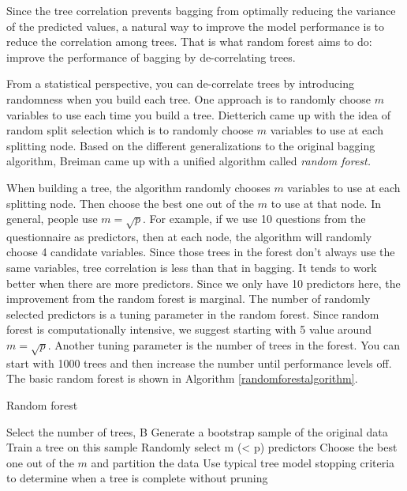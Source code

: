 \documentclass[
  12pt,
]{krantz}
\begin{document}
Since the tree correlation prevents bagging from optimally reducing the variance of the predicted values, a natural way to improve the model performance is to reduce the correlation among trees. That is what random forest aims to do: improve the performance of bagging by de-correlating trees.

From a statistical perspective, you can de-correlate trees by introducing randomness when you build each tree. One approach \citep{Ho1998, amit1997} is to randomly choose \(m\) variables to use each time you build a tree. Dietterich\citep{Dietterich2000} came up with the idea of random split selection which is to randomly choose \(m\) variables to use at each splitting node. Based on the different generalizations to the original bagging algorithm, Breiman \citep{Breiman2001} came up with a unified algorithm called \emph{random forest.}

When building a tree, the algorithm randomly chooses \(m\) variables to use at each splitting node. Then choose the best one out of the \(m\) to use at that node. In general, people use \(m=\sqrt{p}\). For example, if we use 10 questions from the questionnaire as predictors, then at each node, the algorithm will randomly choose 4 candidate variables. Since those trees in the forest don't always use the same variables, tree correlation is less than that in bagging. It tends to work better when there are more predictors. Since we only have 10 predictors here, the improvement from the random forest is marginal. The number of randomly selected predictors is a tuning parameter in the random forest. Since random forest is computationally intensive, we suggest starting with 5 value around \(m=\sqrt{p}\). Another tuning parameter is the number of trees in the forest. You can start with 1000 trees and then increase the number until performance levels off. The basic random forest is shown in Algorithm \ref{randomforestalgorithm}.

\begin{algorithm}
\caption{Random forest}\label{randomforestalgorithm} 
\begin{algorithmic}[1] 
\State Select the number of trees, B
        \State Generate a bootstrap sample of the original data
        \State Train a tree on this sample
                \State Randomly select m (< p) predictors
                \State Choose the best one out of the $m$ and partition the data
            \EndFor
        \State Use typical tree model stopping criteria to determine when a tree is complete without pruning
    \EndFor
\end{algorithmic}
\end{algorithm}
\end{document}
